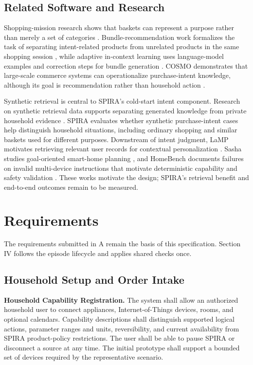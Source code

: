 \documentclass[conference]{IEEEtran}
\begin{document}
\subsection{Related Software and Research}
Shopping-mission research shows that baskets can represent a purpose rather than merely a set of categories \cite{ref1}. Bundle-recommendation work formalizes the task of separating intent-related products from unrelated products in the same shopping session \cite{ref2}, while adaptive in-context learning uses language-model examples and correction steps for bundle generation \cite{ref3}. COSMO demonstrates that large-scale commerce systems can operationalize purchase-intent knowledge, although its goal is recommendation rather than household action \cite{ref4}.

Synthetic retrieval is central to SPIRA's cold-start intent component. Research on synthetic retrieval data supports separating generated knowledge from private household evidence \cite{ref5}. SPIRA evaluates whether synthetic purchase-intent cases help distinguish household situations, including ordinary shopping and similar baskets used for different purposes. Downstream of intent judgment, LaMP motivates retrieving relevant user records for contextual personalization \cite{ref6}. Sasha studies goal-oriented smart-home planning \cite{ref7}, and HomeBench documents failures on invalid multi-device instructions that motivate deterministic capability and safety validation \cite{ref8}. These works motivate the design; SPIRA's retrieval benefit and end-to-end outcomes remain to be measured.

\section{Requirements}
The requirements submitted in A remain the basis of this specification. Section IV follows the episode lifecycle and applies shared checks once.

\subsection{Household Setup and Order Intake}
\textbf{Household Capability Registration.} The system shall allow an authorized household user to connect appliances, Internet-of-Things devices, rooms, and optional calendars. Capability descriptions shall distinguish supported logical actions, parameter ranges and units, reversibility, and current availability from SPIRA product-policy restrictions. The user shall be able to pause SPIRA or disconnect a source at any time. The initial prototype shall support a bounded set of devices required by the representative scenario.
\end{document}
